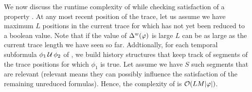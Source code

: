 We now discuss the runtime complexity of \monitor while checking satisfaction of a property \policy. At any most recent position of the trace, let us assume we have maximum $L$ positions in the current trace for which \policy has not yet been reduced to a boolean value.
Note that if the value of $\Delta^w(\varphi)$ is large $L$ can be as large as the current trace length we have seen so far.
Addtionally, for each temporal subformula $\phi_1\,\mathrm{\cal U}\,\phi_2$ of \policy,
we build history structures that
keep track of segments of the trace positions for which $\phi_1$ is true. Let  assume
we have $S$ such segments that are relevant (relevant means they can possibly
influence the satisfaction of the remaining unreduced formulas).
Hence, the complexity of \monitor is
$\mathcal{O}(LM|\varphi|)$.

%

